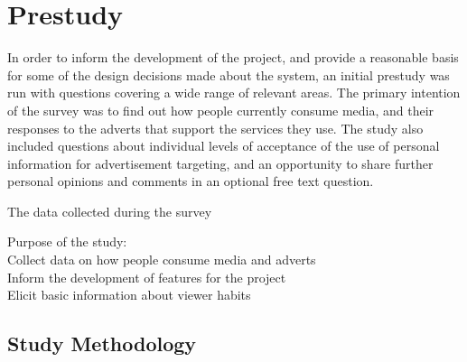 \section{Prestudy}
\label{sec:prestudy}
In order to inform the development of the project, and provide a reasonable basis for some of the design decisions made about the system, an initial prestudy was run with questions covering a wide range of relevant areas. The primary intention of the survey was to find out how people currently consume %
media, and their responses to the adverts that support the services they use. The study also included questions about individual levels of acceptance of the use of personal information for advertisement targeting, and an opportunity to share further personal opinions and comments in an optional free text question. %

The data collected during the survey 





Purpose of the study:\\
Collect data on how people consume media and adverts\\
Inform the development of features for the project\\
Elicit basic information about viewer habits

\subsection{Study Methodology}

